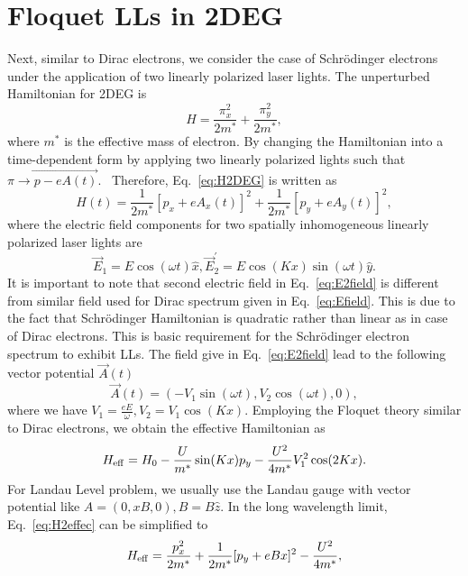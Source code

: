 \section{Floquet LLs in 2DEG}
Next, similar to Dirac electrons, we consider the case of Schr\"{o}dinger electrons under the application of two linearly polarized laser lights. The unperturbed Hamiltonian for 2DEG is%
\begin{equation}\label{eq:H2DEG}
H=\frac{\pi_{x}^{2}}{2m^{\ast}}+\frac{\pi_{y}^{2}}{2m^{\ast}},
\end{equation}
where $m^{\ast}$ is the effective mass of electron. By changing the Hamiltonian into a time-dependent form by applying two linearly polarized lights
such that $\vec{\pi\rightarrow p-eA(t)}$. \ Therefore, Eq.~\eqref{eq:H2DEG} is written as%
\begin{equation}\label{eq:H2time}
H(t)=\frac{1}{2m^{\ast}}[p_{x}+eA_{x}(t)]^{2}+\frac{1}{2m^{\ast}}[p_{y}%
+eA_{y}(t)]^{2},
\end{equation}
where the electric field components for two spatially inhomogeneous linearly polarized laser lights are
\begin{equation} \label{eq:E2field}
\vec{E}_{1} =E\cos (\omega t)\hat{x},\vec{E}_{2}^{\prime}=E\cos
(Kx)\sin (\omega t)\hat{y}.
\end{equation}%
It is important to note that second electric field in Eq.~\eqref{eq:E2field} is different from similar field used for Dirac spectrum given in Eq.~\eqref{eq:Efield}. This is due to the fact that Schr\"{o}dinger Hamiltonian is quadratic rather than linear as in case of Dirac electrons. This is basic requirement for the Schr\"{o}dinger electron spectrum to exhibit LLs. The field give in Eq.~\eqref{eq:E2field} lead to the following vector potential $\vec{A}(t)$
\begin{equation}\label{eq:A2vector}
\vec{A}(t)=(-V_1\sin (\omega t), V_2 \cos (\omega t),0),
\end{equation}%
where we have $V_{1}=\frac{eE}{\omega },V_{2}=V_1\cos(Kx)$. Employing the Floquet theory similar to Dirac electrons, we obtain the effective Hamiltonian as%
\begin{equation}\label{eq:H2effec}
	H_{\rm eff}  =H_{0} -\frac{U}{m^{\ast}}\sin (Kx) p_{y} -\frac{U^2}{4m^{\ast}}V_{1}^{2}\cos(2Kx).
\end{equation}
For Landau Level problem, we usually use the Landau gauge with vector potential
like $A=(0,xB,0),B=B\hat{z}$. In the long wavelength limit, Eq.~\eqref{eq:H2effec} can be simplified to
\begin{equation} \label{eq:H2Feffect}
H_{\rm eff}=\frac{p_{x}^{2}}{2m^{\ast}}+\frac{1}{2m^{\ast}}[p_{y}%
+eBx]^{2}-\frac{U^{2}}{4m^{\ast}},
\end{equation}
